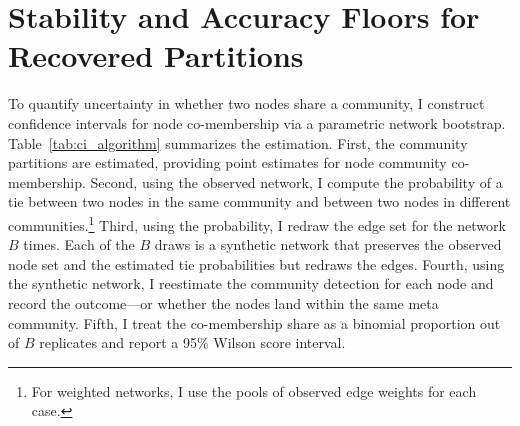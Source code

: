 \documentclass[11pt, letterpaper]{article}
\begin{document}
\section{Stability and Accuracy Floors for Recovered Partitions}\label{sec:uncertainty}

To quantify uncertainty in whether two nodes share a community, I construct confidence intervals for node co-membership via a parametric network bootstrap. Table~\ref{tab:ci_algorithm} summarizes the estimation. First, the community partitions are estimated, providing point estimates for node community co-membership. Second, using the observed network, I compute the probability of a tie between two nodes in the same community and between two nodes in different communities.\footnote{For weighted networks, I use the pools of observed edge weights for each case.} Third, using the probability, I redraw the edge set for the network $B$ times. Each of the $B$ draws is a synthetic network that preserves the observed node set and the estimated tie probabilities but redraws the edges. Fourth, using the synthetic network, I reestimate the community detection for each node and record the outcome---or whether the nodes land within the same meta community. Fifth, I treat the co-membership share as a binomial proportion out of $B$ replicates and report a 95\% Wilson score interval.
\end{document}
